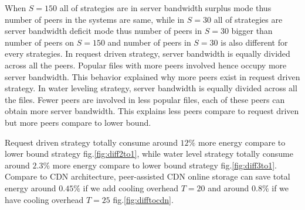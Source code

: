 \documentclass[conference]{IEEEtran}
\begin{document}



When $S=150$ all of strategies are in server bandwidth surplus mode thus number of peers in the systems are same, while in $S=30$ all of strategies are server bandwidth deficit mode thus number of peers in $S=30$ bigger than number of peers on $S=150$ and number of peers in $S=30$ is also different for every strategies. 
In request driven strategy, server bandwidth is equally divided across all the peers. 
Popular files with more peers involved hence occupy more server bandwidth. 
This behavior explained why more peers exist in request driven strategy.
In water leveling strategy, server bandwidth is equally divided across all the files.  
Fewer peers are involved in less popular files, each of these peers can obtain more server bandwidth.  
This explains less peers compare to request driven but more peers compare to lower bound.

Request driven strategy totally consume around $12\%$ more energy compare to lower bound strategy fig.\ref{fig:diff2to1}, while water level strategy totally consume around $2.3\%$ more energy compare to lower bound strategy fig.\ref{fig:diff3to1}.
Compare to CDN architecture, peer-assisted CDN online storage can save total energy around $0.45\%$ if we add cooling overhead $T=20$ and around $0.8\%$ if we have cooling overhead $T=25$ fig.\ref{fig:difftocdn}.
\end{document}
